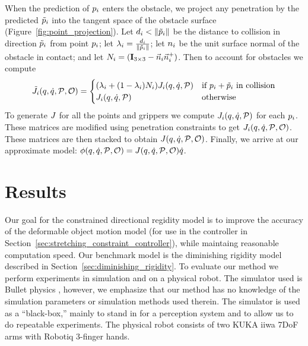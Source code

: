 When the prediction of $p_i$ enters the obstacle, we project any penetration by the predicted $\tilde{p}_i$ into the tangent space of the obstacle surface (Figure~\ref{fig:point_projection}). Let $d_i < \| \tilde{p}_i \|$ be the distance to collision in direction $\tilde{p}_i$ from point $p_i$; let $\lambda_i = \frac{d_i}{\| \tilde{p}_i \|}$; let $n_i$ be the unit surface normal of the obstacle in contact; and let $N_i = (\mathbf{I}_{3\times 3} - \vec{n}_i \vec{n}_i^+)$. Then to account for obstacles we compute
\begin{equation}
    \tilde {J}_i(q, \dot{q}, \mathcal{P}, \mathcal{O}) =
    \begin{cases}
        (\lambda_i + (1 - \lambda_i)N_i) J_i(q, \dot{q}, \mathcal{P}) & \text{if $p_i + \tilde{p}_i$ in collision} \\
        J_i(q, \dot{q}, \mathcal{P}) & \text{otherwise}
    \end{cases}
\end{equation}
To generate $J$ for all the points and grippers we compute $J_i(q, \dot{q}, \mathcal{P})$ for each $p_i$. These matrices are modified using penetration constraints to get $J_i(q, \dot{q}, \mathcal{P}, \mathcal{O})$. These matrices are then stacked to obtain $J(q, \dot{q}, \mathcal{P}, \mathcal{O})$. Finally, we arrive at our approximate model: $\phi(q, \dot{q}, \mathcal{P}, \mathcal{O}) = J(q, \dot{q}, \mathcal{P}, \mathcal{O}) \dot{q}$.


\section{Results}
\label{sec:modelling_results}

Our goal for the constrained directional regidity model is to improve the accuracy of the deformable object motion model (for use in the controller in Section~\ref{sec:stretching_constraint_controller}), while maintaing reasonable computation speed. Our benchmark model is the diminishing rigidity model described in Section~\ref{sec:diminishing_rigidity}. To evaluate our method we perform experiments in simulation and on a physical robot. The simulator used is Bullet physics \cite{Coumans2010}, however, we emphasize that our method has no knowledge of the simulation parameters or simulation methods used therein. The simulator is used as a ``black-box,'' mainly to stand in for a perception system and to allow us to do repeatable experiments. The physical robot consists of two KUKA iiwa 7DoF arms with Robotiq 3-finger hands.

